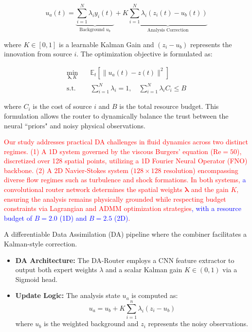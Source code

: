\documentclass[preprint,12pt,authoryear]{elsarticle}
\begin{document}
\begin{equation}
u_a(t) = \underbrace{\sum_{i=1}^N \lambda_i y_i(t)}_{\text{Background } u_b} + K \underbrace{\sum_{i=1}^N \lambda_i \left( z_i(t) - u_b(t) \right)}_{\text{Analysis Correction}}
\end{equation}

where $K \in [0, 1]$ is a learnable Kalman Gain and $(z_i - u_b)$ represents the innovation from source $i$. The optimization objective is formulated as:

\begin{equation}
\begin{aligned}
\min_{\mathbf{\lambda}, K} \quad & \mathbb{E}_{t} \left[ \| u_a(t) - z(t) \|^2 \right] \\
\text{s.t.} \quad & \sum_{i=1}^N \lambda_i = 1, \quad \sum_{i=1}^N \lambda_i C_i \leq B
\end{aligned}
\end{equation}

where $C_i$ is the cost of source $i$ and $B$ is the total resource budget. This formulation allows the router to dynamically balance the trust between the neural ``priors" and noisy physical observations.

\textcolor{red}{Our study addresses practical DA challenges in fluid dynamics across two distinct regimes. (1) A 1D system governed by the viscous Burgers' equation ($\text{Re}=50$), discretized over 128 spatial points, utilizing a 1D Fourier Neural Operator (FNO) backbone. (2) A 2D Navier-Stokes system ($128 \times 128$ resolution) encompassing diverse flow regimes such as turbulence and shock formations. In both systems, \textcolor{blue}{a} convolutional router network determines the spatial weights $\mathbf{\lambda}$ and the gain $K$, ensuring the analysis remains physically grounded while respecting budget constraints via Lagrangian and ADMM optimization strategies\textcolor{blue}{, with a resource budget of $B=2.0$ (1D) and $B=2.5$ (2D)}.}


A differentiable Data Assimilation (DA) pipeline where the combiner facilitates a Kalman-style correction.

\begin{itemize}
    \item \textbf{DA Architecture:} The DA-Router employs a CNN feature extractor to output both expert weights $\lambda$ and a scalar Kalman gain $K \in (0, 1)$ via a Sigmoid head.
    \item \textbf{Update Logic:} The analysis state $u_a$ is computed as:
    \begin{equation}
        u_a = u_b + K \sum_{i=1}^n \lambda_i(z_i - u_b)
    \end{equation}
    where $u_b$ is the weighted background and $z_i$ represents the noisy observations.

\end{itemize}
\end{document}
